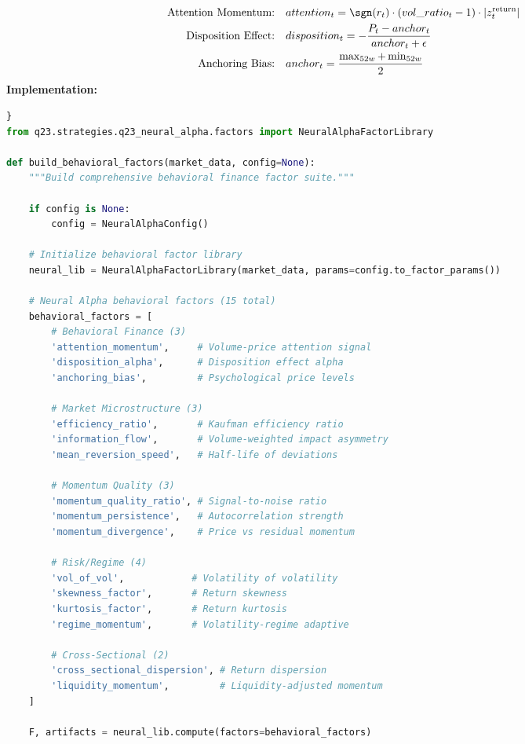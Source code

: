 \documentclass[11pt,letterpaper,openany]{book}
\begin{document}
\begin{align}
\text{Attention Momentum:} \quad & attention_t = \sgn(r_t) \cdot (vol\_ratio_t - 1) \cdot |z_t^{\text{return}}| \\
\text{Disposition Effect:} \quad & disposition_t = -\frac{P_t - anchor_t}{anchor_t + \epsilon} \\
\text{Anchoring Bias:} \quad & anchor_t = \frac{\max_{52w} + \min_{52w}}{2}
\end{align}
\textbf{Implementation:}
\begin{lstlisting}[language=Python,caption=Q23 Behavioral Finance Factors]}
from q23.strategies.q23_neural_alpha.factors import NeuralAlphaFactorLibrary

def build_behavioral_factors(market_data, config=None):
    """Build comprehensive behavioral finance factor suite."""
    
    if config is None:
        config = NeuralAlphaConfig()
    
    # Initialize behavioral factor library
    neural_lib = NeuralAlphaFactorLibrary(market_data, params=config.to_factor_params())
    
    # Neural Alpha behavioral factors (15 total)
    behavioral_factors = [
        # Behavioral Finance (3)
        'attention_momentum',     # Volume-price attention signal
        'disposition_alpha',      # Disposition effect alpha  
        'anchoring_bias',         # Psychological price levels
        
        # Market Microstructure (3)
        'efficiency_ratio',       # Kaufman efficiency ratio
        'information_flow',       # Volume-weighted impact asymmetry
        'mean_reversion_speed',   # Half-life of deviations
        
        # Momentum Quality (3)
        'momentum_quality_ratio', # Signal-to-noise ratio
        'momentum_persistence',   # Autocorrelation strength
        'momentum_divergence',    # Price vs residual momentum
        
        # Risk/Regime (4)
        'vol_of_vol',            # Volatility of volatility
        'skewness_factor',       # Return skewness
        'kurtosis_factor',       # Return kurtosis  
        'regime_momentum',       # Volatility-regime adaptive
        
        # Cross-Sectional (2)
        'cross_sectional_dispersion', # Return dispersion
        'liquidity_momentum',         # Liquidity-adjusted momentum
    ]
    
    F, artifacts = neural_lib.compute(factors=behavioral_factors)
    

\end{lstlisting}
\end{document}
